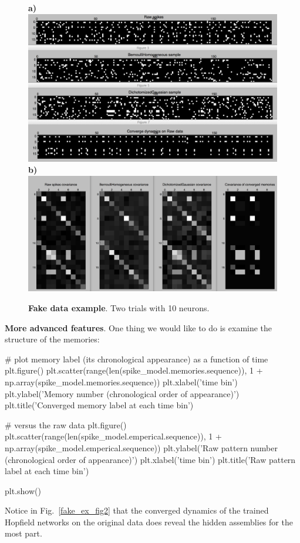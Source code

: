 \documentclass[letter, 12pt]{article}
\theoremstyle{definition}
\theoremstyle{remark}
\begin{document}
\begin{figure}
\begin{center}
\textbf{a)}\includegraphics[width=.41\linewidth]{demo_fake_spikes.png} 
\textbf{b)}\includegraphics[width=.53\linewidth]{cov_demo.png} 
\caption{\textbf{Fake data example}. Two trials with 10 neurons.}
\label{fake_ex_fig}
\vspace{-.8cm}
\end{center}
\end{figure}

\textbf{More advanced features}.  One thing we would like to do is examine the structure of the memories:

\begin{python}
# plot memory label (its chronological appearance) as a function of time
plt.figure()
plt.scatter(range(len(spike_model.memories.sequence)),
		1 + np.array(spike_model.memories.sequence))
plt.xlabel('time bin')
plt.ylabel('Memory number (chronological order of appearance)')
plt.title('Converged memory label at each time bin')

# versus the raw data
plt.figure()
plt.scatter(range(len(spike_model.emperical.sequence)),
		1 + np.array(spike_model.emperical.sequence))
plt.ylabel('Raw pattern number (chronological order of appearance)')
plt.xlabel('time bin')
plt.title('Raw pattern label at each time bin')

plt.show()
\end{python}
 
Notice in Fig.~\ref{fake_ex_fig2} that the converged dynamics of the trained Hopfield networks on the original data does reveal the 
hidden assemblies for the most part.
\end{document}
